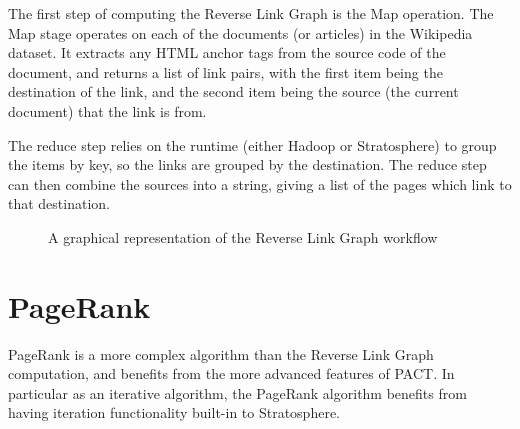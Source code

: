 The first step of computing the Reverse Link Graph is the Map operation. The Map stage operates on each of the documents (or articles) in the Wikipedia dataset. It extracts any HTML anchor tags from the source code of the document, and returns a list of link pairs, with the first item being the destination of the link, and the second item being the source (the current document) that the link is from.

The reduce step relies on the runtime (either Hadoop or Stratosphere) to group the items by key, so the links are grouped by the destination. The reduce step can then combine the sources into a string, giving a list of the pages which link to that destination. 

\begin{figure}[H]

\caption{A graphical representation of the Reverse Link Graph workflow}
\end{figure}

\section{PageRank}
PageRank is a more complex algorithm than the Reverse Link Graph computation, and benefits from the more advanced features of PACT. In particular as an iterative algorithm, the PageRank algorithm benefits from having iteration functionality built-in to Stratosphere. 

